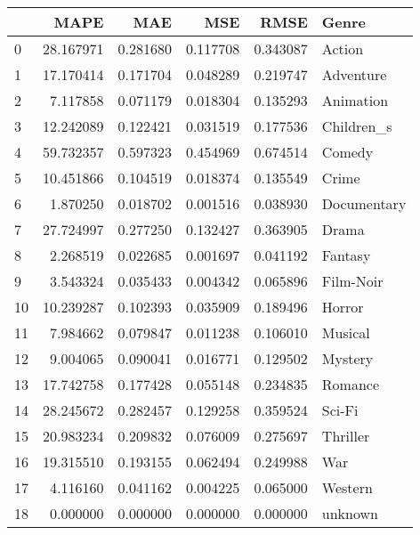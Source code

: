 \begin{tabular}{lrrrrl}
\toprule
 & MAPE & MAE & MSE & RMSE & Genre \\
\midrule
0 & 28.167971 & 0.281680 & 0.117708 & 0.343087 & Action \\
1 & 17.170414 & 0.171704 & 0.048289 & 0.219747 & Adventure \\
2 & 7.117858 & 0.071179 & 0.018304 & 0.135293 & Animation \\
3 & 12.242089 & 0.122421 & 0.031519 & 0.177536 & Children_s \\
4 & 59.732357 & 0.597323 & 0.454969 & 0.674514 & Comedy \\
5 & 10.451866 & 0.104519 & 0.018374 & 0.135549 & Crime \\
6 & 1.870250 & 0.018702 & 0.001516 & 0.038930 & Documentary \\
7 & 27.724997 & 0.277250 & 0.132427 & 0.363905 & Drama \\
8 & 2.268519 & 0.022685 & 0.001697 & 0.041192 & Fantasy \\
9 & 3.543324 & 0.035433 & 0.004342 & 0.065896 & Film-Noir \\
10 & 10.239287 & 0.102393 & 0.035909 & 0.189496 & Horror \\
11 & 7.984662 & 0.079847 & 0.011238 & 0.106010 & Musical \\
12 & 9.004065 & 0.090041 & 0.016771 & 0.129502 & Mystery \\
13 & 17.742758 & 0.177428 & 0.055148 & 0.234835 & Romance \\
14 & 28.245672 & 0.282457 & 0.129258 & 0.359524 & Sci-Fi \\
15 & 20.983234 & 0.209832 & 0.076009 & 0.275697 & Thriller \\
16 & 19.315510 & 0.193155 & 0.062494 & 0.249988 & War \\
17 & 4.116160 & 0.041162 & 0.004225 & 0.065000 & Western \\
18 & 0.000000 & 0.000000 & 0.000000 & 0.000000 & unknown \\
\bottomrule
\end{tabular}
